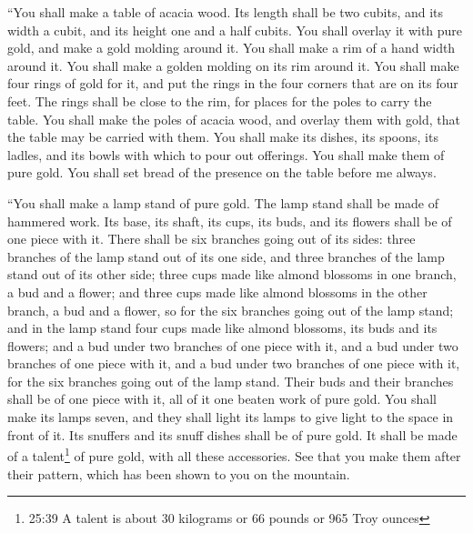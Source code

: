 \myverse{}“You shall make a table of acacia wood. Its length shall be
two cubits, and its width a cubit, and its height one and a half cubits.
\myverse{}You shall overlay it with pure gold, and make a gold molding around it.
\myverse{}You shall make a rim of a hand width around it. You shall make a golden molding
on its rim around it.
\myverse{}You shall make four rings of gold for it, and put the rings in the four corners
that are on its four feet.
\myverse{}The rings shall be close to the rim, for places for the poles to carry the
table.
\myverse{}You shall make the poles of acacia wood, and overlay them with gold, that
the table may be carried with them.
\myverse{}You shall make its dishes, its spoons, its ladles, and its bowls with which
to pour out offerings. You shall make them of pure gold.
\myverse{}You shall set bread of the presence on the table before me always.


\myverse{}“You shall make a lamp stand of pure gold. The lamp stand shall
be made of hammered work. Its base, its shaft, its cups, its buds, and its flowers shall be of one piece
with it.
\myverse{}There shall be six branches going out of its sides: three branches of the
lamp stand out of its one side, and three branches of the lamp stand out of its other side;
\myverse{}three cups made like almond blossoms in one branch, a bud and a flower; and
three cups made like almond blossoms in the other branch, a bud and a flower, so for the six branches
going out of the lamp stand;
\myverse{}and in the lamp stand four cups made like almond blossoms, its buds and its
flowers;
\myverse{}and a bud under two branches of one piece with it, and a bud under two branches
of one piece with it, and a bud under two branches of one piece with it, for the six branches going out
of the lamp stand.
\myverse{}Their buds and their branches shall be of one piece with it, all of it one
beaten work of pure gold.
\myverse{}You shall make its lamps seven, and they shall light its lamps to give light
to the space in front of it.
\myverse{}Its snuffers and its snuff dishes shall be of pure gold.
\myverse{}It shall be made of a talent\footnote{25:39 A talent is about 30 kilograms or 66 pounds or 965 Troy ounces} of pure gold, with all
these accessories.
\myverse{}See that you make them after their pattern, which has been shown to you on
the mountain.


